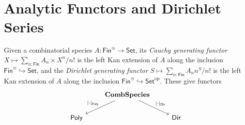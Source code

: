\documentclass[11pt, article, one side]{memoir}
\theoremstyle{theorem}
\newtheorem{theorem}[section]{Theorem}
\theoremstyle{definition}
\theoremstyle{remark}
\newcommand{\Cat}[1]{\mathsf{#1}}%
\newcommand{\To}[1]{\xrightarrow{#1}}
\newcommand{\ol}[1]{\overline{#1}}
\newcommand{\smset}{\Cat{Set}}
\newcommand{\finset}{\Cat{Fin}}
\newcommand{\cont}{\Cat{Cont}}
\newcommand{\bun}{\Cat{Bun}}
\newcommand{\yon}{\mathcal{y}}
\newcommand{\poly}{\Cat{Poly}}
\newcommand{\dir}{\Cat{Dir}}
\newcommand{\qqand}{\qquad\text{and}\qquad}
\begin{document}
%
%

\iffalse
\section{Analytic Functors and Dirichlet Series}

Given a combinatorial species $A : \finset^{\cong} \to \smset$, its
\emph{Cauchy generating functor} $X \mapsto \sum_{n : \finset} A_n \times X^n/n!$
is the left Kan extension of $A$ along the inclusion $\finset^{\cong}
\hookrightarrow \smset$, and the \emph{Dirichlet generating functor} $S \mapsto
\sum_{n : \finset} A_n n^S/n!$ is the left Kan extension of $A$ along the
inclusion $\finset^{\cong} \hookrightarrow \smset^{\text{op}}$. These give
functors
\[
  \begin{tikzcd}
    & \textbf{CombSpecies} \arrow[dr, "|\cdot|_{\dir}"] \arrow[dl, "|\cdot|_{\poly}"']& \\
    \poly & & \dir
  \end{tikzcd}
\]
\end{document}
